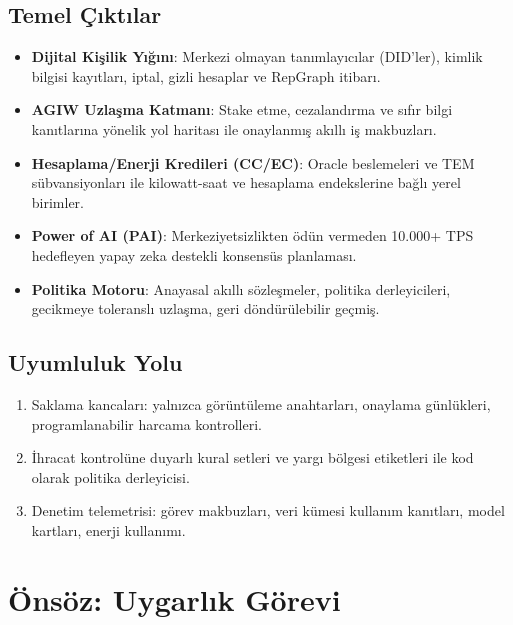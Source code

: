 \documentclass[11pt]{article}
\begin{document}
\subsection{Temel Çıktılar}
\begin{itemize}[noitemsep]
  \item \textbf{Dijital Kişilik Yığını}: Merkezi olmayan tanımlayıcılar (DID'ler), kimlik bilgisi kayıtları, iptal, gizli hesaplar ve RepGraph itibarı.
  \item \textbf{AGIW Uzlaşma Katmanı}: Stake etme, cezalandırma ve sıfır bilgi kanıtlarına yönelik yol haritası ile onaylanmış akıllı iş makbuzları.
  \item \textbf{Hesaplama/Enerji Kredileri (CC/EC)}: Oracle beslemeleri ve TEM sübvansiyonları ile kilowatt-saat ve hesaplama endekslerine bağlı yerel birimler.
  \item \textbf{Power of AI (PAI)}: Merkeziyetsizlikten ödün vermeden 10.000+ TPS hedefleyen yapay zeka destekli konsensüs planlaması.
  \item \textbf{Politika Motoru}: Anayasal akıllı sözleşmeler, politika derleyicileri, gecikmeye toleranslı uzlaşma, geri döndürülebilir geçmiş.
\end{itemize}

\subsection{Uyumluluk Yolu}
\begin{enumerate}[noitemsep]
  \item Saklama kancaları: yalnızca görüntüleme anahtarları, onaylama günlükleri, programlanabilir harcama kontrolleri.
  \item İhracat kontrolüne duyarlı kural setleri ve yargı bölgesi etiketleri ile kod olarak politika derleyicisi.
  \item Denetim telemetrisi: görev makbuzları, veri kümesi kullanım kanıtları, model kartları, enerji kullanımı.
\end{enumerate}

\section{Önsöz: Uygarlık Görevi}
\end{document}
